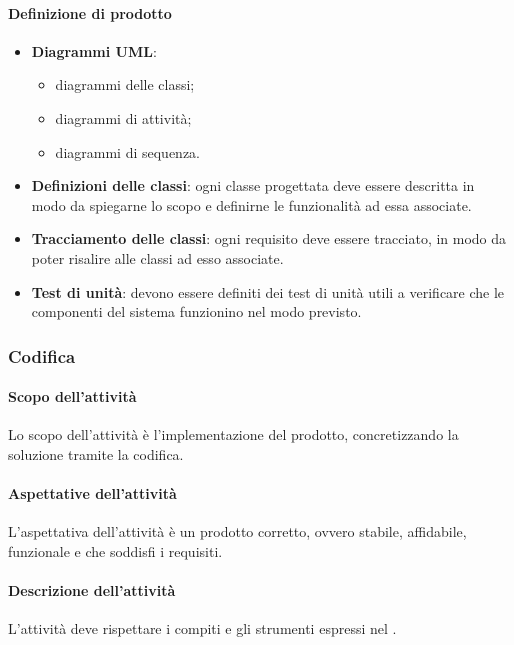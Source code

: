  \paragraph{Definizione di prodotto}
 \begin{itemize}
 	\item \textbf{Diagrammi UML}:
 	\begin{itemize}
 		\item diagrammi delle classi;
 		\item diagrammi di attività;
 		\item diagrammi di sequenza.
 	\end{itemize}
 	\item \textbf{Definizioni delle classi}: ogni classe progettata deve essere descritta in modo da spiegarne lo scopo e definirne le
 	funzionalità ad essa associate.
 	\item \textbf{Tracciamento delle classi}: ogni requisito deve essere tracciato, in modo da poter risalire alle classi ad esso associate. 
 	\item \textbf{Test di unità}: devono essere definiti dei test di unità utili a verificare che le componenti del sistema funzionino nel modo previsto.
 \end{itemize}
 
 
 \subsubsection{Codifica}
 \paragraph{Scopo dell'attività}
 Lo scopo dell'attività è l'implementazione del prodotto, concretizzando la soluzione tramite la codifica.  
 \paragraph{Aspettative dell'attività}
 L'aspettativa dell'attività è un prodotto corretto, ovvero stabile, affidabile, funzionale e che soddisfi i requisiti. 
 \paragraph{Descrizione dell'attività}
 L'attività deve rispettare i compiti e gli strumenti espressi nel \PPdocRP.
